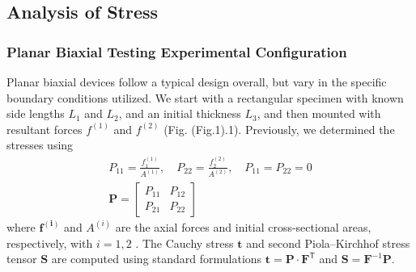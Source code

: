     
\subsection{Analysis of Stress}

\subsubsection{Planar Biaxial Testing Experimental Configuration}

    Planar biaxial devices follow a typical design overall, but vary in the specific boundary conditions utilized. We start with a rectangular specimen with known side lengths $L_1$ and $L_2$, and an initial thickness $L_3$, and then mounted with resultant forces $f^{(1)}$ and $f^{(2)}$ (Fig. (Fig.1).1). Previously, we determined the stresses using
        \begin{equation}
        \begin{gathered}
        P_{11} = \frac{f_1^{(1)}}{A^{(1)}}, \quad P_{22} = \frac{f_2^{(2)}}{A^{(2)}}, \quad P_{11} = P_{22} = 0 \\
        \mathbf{P}
        =   \begin{bmatrix}
            P_{11} & P_{12} \\
            P_{21} & P_{22} 
            \end{bmatrix}
        \end{gathered}\label{A:eqn:3}
        \end{equation}
    where $\mathbf{f^{(i)}}$ and $A^{(i)}$ are the axial forces and initial cross-sectional areas, respectively, with $i = {1,2}$ \cite{sacks_method_1999}. The Cauchy stress $\mathbf{t}$ and second Piola–Kirchhof stress tensor $\mathbf{S}$ are computed using standard formulations $\mathbf{t} = \mathbf{P} \cdot \mathbf{F}^\mathsf{T}$ and $\mathbf{S} = \mathbf{F}^{-1}\mathbf{P}$.
    
